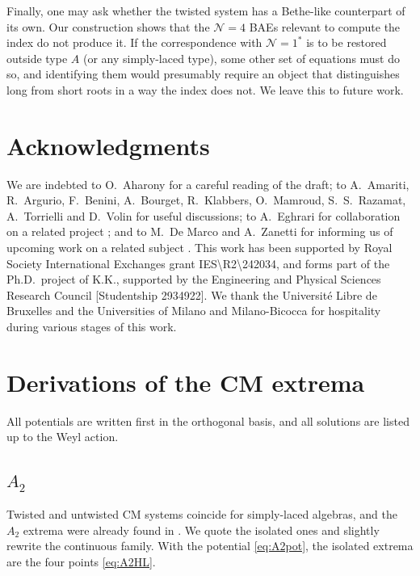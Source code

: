 \documentclass[aps, prx, nofootinbib, twocolumn,amsfonts,amsmath,amssymb,mathtools,superscriptaddress,preprintnumbers,floatfix,reprint]{revtex4-2}
\begin{document}
Finally, one may ask whether the twisted system has a Bethe-like counterpart of
its own. Our construction shows that the $\mathcal{N}=4$ BAEs relevant to compute the index do not produce
it. If the correspondence with $\mathcal{N}=1^\ast$ is to be restored outside
type $A$ (or any simply-laced type), some other set of equations must do so, and identifying them
would presumably require an object that distinguishes long from short roots in
a way the index does not. We leave this to future work.

\bigskip

\section*{Acknowledgments}

We are indebted to O.~Aharony for a careful reading of the draft; to A.~Amariti,
R.~Argurio, F.~Benini, A.~Bourget, R.~Klabbers, O.~Mamroud, S.~S.~Razamat,
A.~Torrielli and D.~Volin for useful discussions; to A.~Eghrari for
collaboration on a related project \cite{polypaper}; and to M.~De Marco and
A.~Zanetti for informing us of upcoming work on a related subject
\cite{demarco-zanetti}. This work has been supported by Royal Society
International Exchanges grant IES\textbackslash R2\textbackslash 242034, and
forms part of the Ph.D.\ project of K.K., supported by the Engineering and
Physical Sciences Research Council [Studentship 2934922]. We thank the
Universit\'e Libre de Bruxelles and the Universities of Milano and
Milano-Bicocca for hospitality during various stages of this work.

\appendix

\section{Derivations of the CM extrema}
\label{app:CM}

All potentials are written first in the orthogonal basis, and all solutions are
listed up to the Weyl action.

\subsection{\texorpdfstring{$A_2$}{A2}}
\label{sub:A2CM}

Twisted and untwisted CM systems coincide for simply-laced algebras, and the
$A_2$ extrema were already found in \cite[Eq. (4.16)]{Bourget:2015upj}. We quote the
isolated ones and slightly rewrite the continuous family. With the potential
\eqref{eq:A2pot}, the isolated extrema are the four points \eqref{eq:A2HL}.
\end{document}
